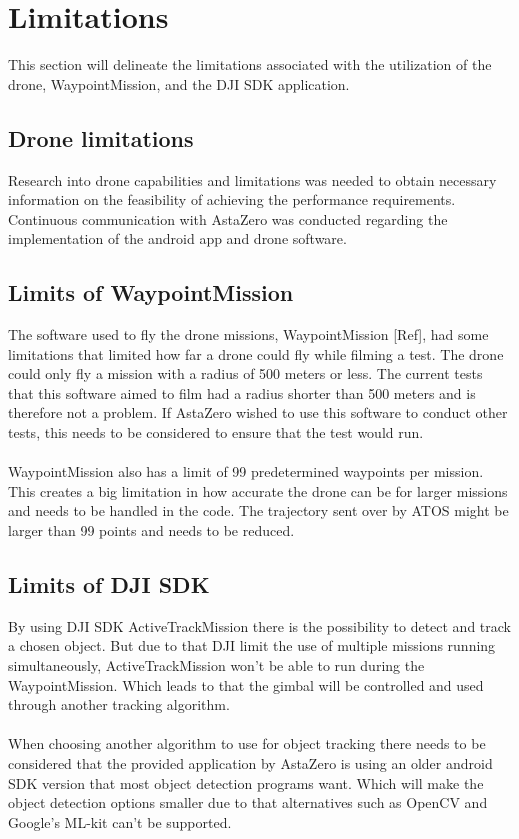 \section{Limitations} \label{Limitations}
This section will delineate the limitations associated with the utilization of the drone, WaypointMission, and the DJI SDK application.


\subsection{Drone limitations} \label{Dron limitations}
Research into drone capabilities and limitations was needed to obtain necessary information on the feasibility of achieving the performance requirements. Continuous communication with AstaZero was conducted regarding the implementation of the android app and drone software.

\subsection{Limits of WaypointMission} \label{limits of waypointmission}
\label{sec:limit_WP}
The software used to fly the drone missions, WaypointMission [Ref], had some limitations that limited how far a drone could fly while filming a test. The drone could only fly a mission with a radius of 500 meters or less. The current tests that this software aimed to film had a radius shorter than 500 meters and is therefore not a problem. If AstaZero wished to use this software to conduct other tests, this needs to be considered to ensure that the test would run.
\\ \\
WaypointMission also has a limit of 99 predetermined waypoints per mission. This creates a big limitation in how accurate the drone can be for larger missions and needs to be handled in the code. The trajectory sent over by ATOS might be larger than 99 points and needs to be reduced. 

\subsection{Limits of DJI SDK} \label{limits of dji sdk}
By using DJI SDK ActiveTrackMission there is the possibility to detect and track a chosen object. But due to that DJI limit the use of multiple missions running simultaneously, ActiveTrackMission won't be able to run during the WaypointMission. Which leads to that the gimbal will be controlled and used through another tracking algorithm. 
\\ \\
When choosing another algorithm to use for object tracking there needs to be considered that the provided application by AstaZero is using an older android SDK version that most object detection programs want. Which will make the object detection options smaller due to that alternatives such as OpenCV and Google's ML-kit can't be supported.

